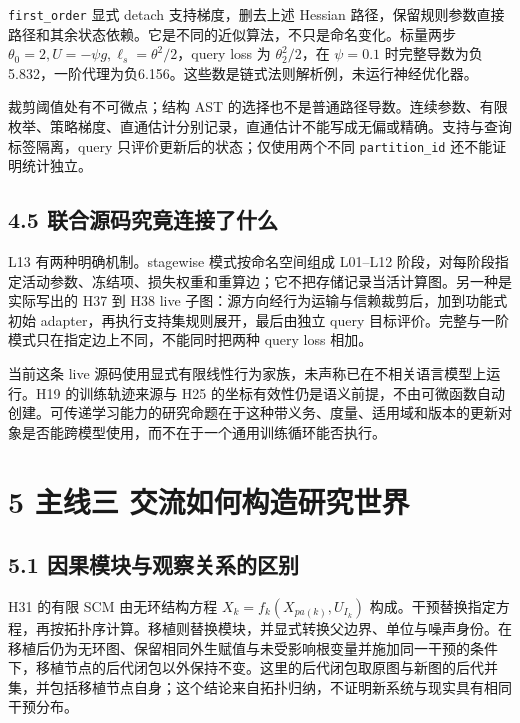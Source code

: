 \documentclass[
  10pt,
]{article}
\begin{document}
\nolinkurl{first_order} 显式 detach 支持梯度，删去上述 Hessian
路径，保留规则参数直接路径和其余状态依赖。它是不同的近似算法，不只是命名变化。标量两步
\(\theta_0=2,U=-\psi g,\ell_s=\theta^2/2\)，query loss 为
\(\theta_2^2/2\)，在 \(\psi=0.1\)
时完整导数为负5.832，一阶代理为负6.156。这些数是链式法则解析例，未运行神经优化器。

裁剪阈值处有不可微点；结构 AST
的选择也不是普通路径导数。连续参数、有限枚举、策略梯度、直通估计分别记录，直通估计不能写成无偏或精确。支持与查询标签隔离，query
只评价更新后的状态；仅使用两个不同 \nolinkurl{partition_id}
还不能证明统计独立。

\subsection{4.5
联合源码究竟连接了什么}\label{ux8054ux5408ux6e90ux7801ux7a76ux7adfux8fdeux63a5ux4e86ux4ec0ux4e48}

L13 有两种明确机制。stagewise 模式按命名空间组成 L01--L12
阶段，对每阶段指定活动参数、冻结项、损失权重和重算边；它不把存储记录当活计算图。另一种是实际写出的
H37 到 H38 live 子图：源方向经行为运输与信赖裁剪后，加到功能式初始
adapter，再执行支持集规则展开，最后由独立 query
目标评价。完整与一阶模式只在指定边上不同，不能同时把两种 query loss
相加。

当前这条 live
源码使用显式有限线性行为家族，未声称已在不相关语言模型上运行。H19
的训练轨迹来源与 H25
的坐标有效性仍是语义前提，不由可微函数自动创建。可传递学习能力的研究命题在于这种带义务、度量、适用域和版本的更新对象是否能跨模型使用，而不在于一个通用训练循环能否执行。

\section{5 主线三
交流如何构造研究世界}\label{ux4e3bux7ebfux4e09-ux4ea4ux6d41ux5982ux4f55ux6784ux9020ux7814ux7a76ux4e16ux754c}

\subsection{5.1
因果模块与观察关系的区别}\label{ux56e0ux679cux6a21ux5757ux4e0eux89c2ux5bdfux5173ux7cfbux7684ux533aux522b}

H31 的有限 SCM 由无环结构方程 \(X_k=f_k(X_{pa(k)},U_{I_k})\)
构成。干预替换指定方程，再按拓扑序计算。移植则替换模块，并显式转换父边界、单位与噪声身份。在移植后仍为无环图、保留相同外生赋值与未受影响根变量并施加同一干预的条件下，移植节点的后代闭包以外保持不变。这里的后代闭包取原图与新图的后代并集，并包括移植节点自身；这个结论来自拓扑归纳，不证明新系统与现实具有相同干预分布。
\end{document}
